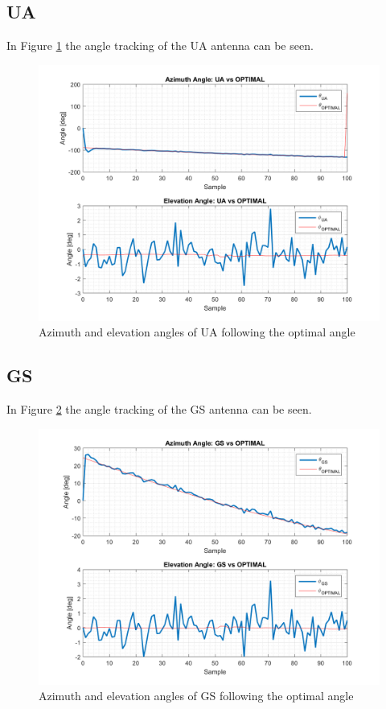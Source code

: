\subsection{UA}
In Figure \ref{fig:s4_ua} the angle tracking of the UA antenna can be seen.

\begin{figure}[H]
	\centering
	\includegraphics[scale=0.75]{figures/s4_ua.png}
	\caption{Azimuth and elevation angles of UA following the optimal angle}
	\label{fig:s4_ua}
\end{figure}

\subsection{GS}
In Figure \ref{fig:s4_gs} the angle tracking of the GS antenna can be seen.

\begin{figure}[H]
	\centering
	\includegraphics[scale=0.75]{figures/s4_gs.png}
	\caption{Azimuth and elevation angles of GS following the optimal angle}
	\label{fig:s4_gs}
\end{figure}

